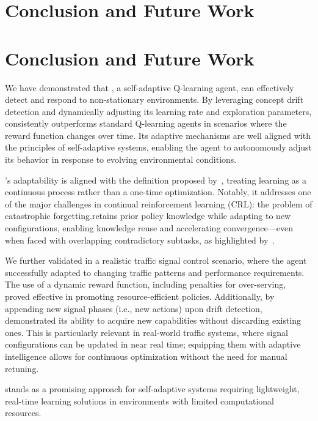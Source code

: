 
\section{Conclusion and Future Work}
\label{sec:conclusion}

\section{Conclusion and Future Work}

We have demonstrated that \adaptiverl, a self-adaptive Q-learning agent, can effectively detect and respond to non-stationary environments. By leveraging concept drift detection and dynamically adjusting its learning rate and exploration parameters, \adaptiverl consistently outperforms standard Q-learning agents in scenarios where the reward function changes over time. Its adaptive mechanisms are well aligned with the principles of self-adaptive systems, enabling the agent to autonomously adjust its behavior in response to evolving environmental conditions.

\adaptiverl's adaptability is aligned with the definition proposed by~\citet{abel2023definitioncontinualreinforcementlearning}, treating learning as a continuous process rather than a one-time optimization. Notably, it addresses one of the major challenges in continual reinforcement learning (CRL): the problem of catastrophic forgetting.\adaptiverl retains prior policy knowledge while adapting to new configurations, enabling knowledge reuse and accelerating convergence—even when faced with overlapping contradictory subtasks, as highlighted by~\citet{Bagus2022}.

We further validated \adaptiverl in a realistic traffic signal control scenario, where the agent successfully adapted to changing traffic patterns and performance requirements. The use of a dynamic reward function, including penalties for over-serving, proved effective in promoting resource-efficient policies. Additionally, by appending new signal phases (i.e., new actions) upon drift detection, \adaptiverl demonstrated its ability to acquire new capabilities without discarding existing ones. This is particularly relevant in real-world traffic systems, where signal configurations can be updated in near real time; equipping them with adaptive intelligence allows for continuous optimization without the need for manual retuning.

\adaptiverl stands as a promising approach for self-adaptive systems requiring lightweight, real-time learning solutions in environments with limited computational resources.

